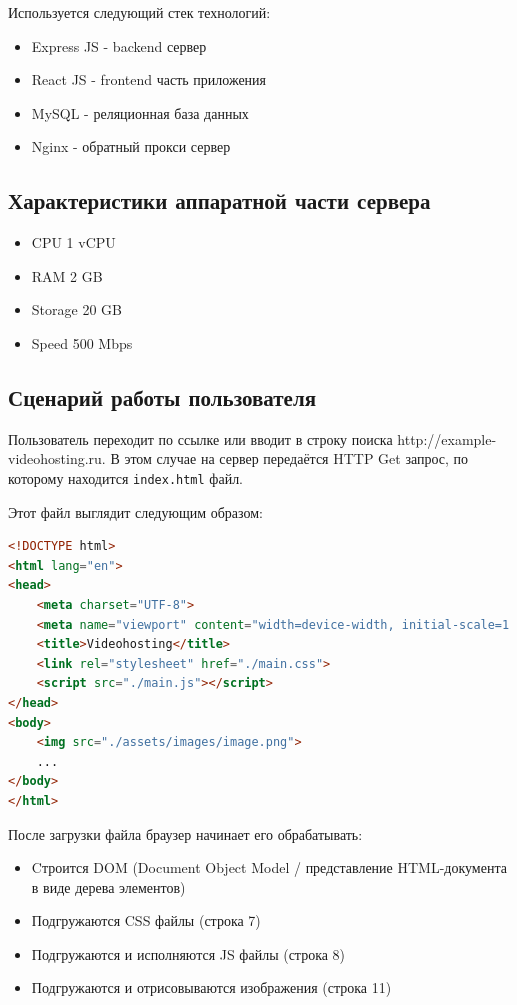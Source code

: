 \documentclass[12pt]{article}
\begin{document}
Используется следующий стек технологий:

\begin{itemize}
    \item Express JS - backend сервер
    \item React JS - frontend часть приложения
    \item MySQL - реляционная база данных
    \item Nginx - обратный прокси сервер
\end{itemize}

\subsection{Характеристики аппаратной части сервера}

\begin{itemize}
    \item CPU 1 vCPU
    \item RAM 2 GB
    \item Storage 20 GB
    \item Speed 500 Mbps
\end{itemize}

\subsection{Сценарий работы пользователя}

Пользователь переходит по ссылке или вводит в строку поиска http://example-videohosting.ru.
В этом случае на сервер передаётся HTTP Get запрос, по которому находится \verb|index.html| файл.

Этот файл выглядит следующим образом:

\begin{lstlisting}[language=HTML]
<!DOCTYPE html>
<html lang="en">
<head>
    <meta charset="UTF-8">
    <meta name="viewport" content="width=device-width, initial-scale=1.0">
    <title>Videohosting</title>
    <link rel="stylesheet" href="./main.css">
    <script src="./main.js"></script>
</head>
<body>
    <img src="./assets/images/image.png">
    ...
</body>
</html>
\end{lstlisting}

После загрузки файла браузер начинает его обрабатывать:

\begin{itemize}
    \item Cтроится DOM (Document Object Model / представление HTML-документа в виде дерева элементов)
    \item Подгружаются CSS файлы (строка 7)
    \item Подгружаются и исполняются JS файлы (строка 8)
    \item Подгружаются и отрисовываются изображения (строка 11)
\end{itemize}
\end{document}
